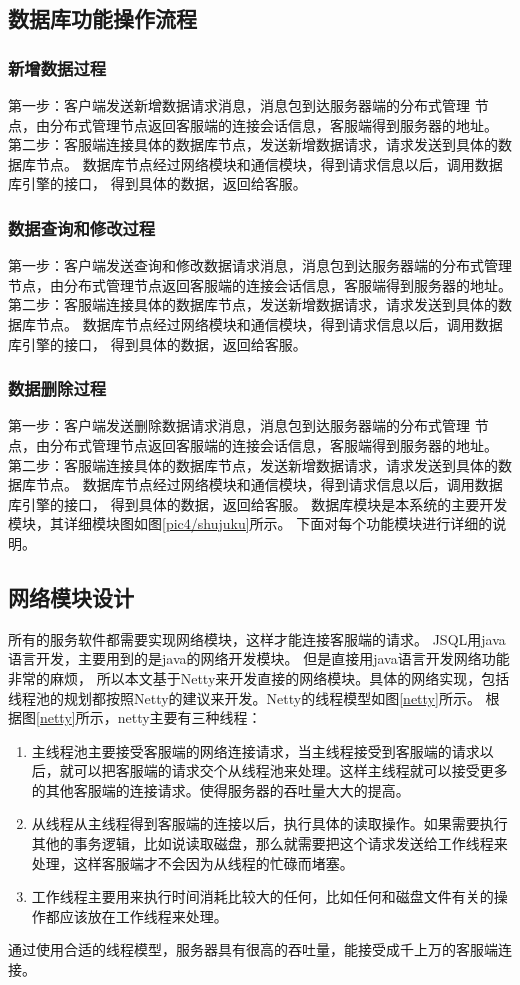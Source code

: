 \subsection{数据库功能操作流程}
\subsubsection{新增数据过程}
第一步：客户端发送新增数据请求消息，消息包到达服务器端的分布式管理
节点，由分布式管理节点返回客服端的连接会话信息，客服端得到服务器的地址。
第二步：客服端连接具体的数据库节点，发送新增数据请求，请求发送到具体的数据库节点。
数据库节点经过网络模块和通信模块，得到请求信息以后，调用数据库引擎的接口，
得到具体的数据，返回给客服。
\subsubsection{数据查询和修改过程}
第一步：客户端发送查询和修改数据请求消息，消息包到达服务器端的分布式管理
节点，由分布式管理节点返回客服端的连接会话信息，客服端得到服务器的地址。
第二步：客服端连接具体的数据库节点，发送新增数据请求，请求发送到具体的数据库节点。
数据库节点经过网络模块和通信模块，得到请求信息以后，调用数据库引擎的接口，
得到具体的数据，返回给客服。
\subsubsection{数据删除过程}
第一步：客户端发送删除数据请求消息，消息包到达服务器端的分布式管理
节点，由分布式管理节点返回客服端的连接会话信息，客服端得到服务器的地址。
第二步：客服端连接具体的数据库节点，发送新增数据请求，请求发送到具体的数据库节点。
数据库节点经过网络模块和通信模块，得到请求信息以后，调用数据库引擎的接口，
得到具体的数据，返回给客服。
数据库模块是本系统的主要开发模块，其详细模块图如图\ref{pic4/shujuku}所示。
下面对每个功能模块进行详细的说明。
\subsection{网络模块设计}
所有的服务软件都需要实现网络模块，这样才能连接客服端的请求。
JSQL用java语言开发，主要用到的是java的网络开发模块。
但是直接用java语言开发网络功能非常的麻烦，
所以本文基于Netty来开发直接的网络模块。具体的网络实现，包括
线程池的规划都按照Netty的建议来开发。Netty的线程模型如图\ref{netty}所示。
根据图\ref{netty}所示，netty主要有三种线程：
\begin{enumerate}[fullwidth,itemindent=2em,listparindent=2em]
	\item 主线程池主要接受客服端的网络连接请求，当主线程接受到客服端的请求以后，就可以把客服端的请求交个从线程池来处理。这样主线程就可以接受更多的其他客服端的连接请求。使得服务器的吞吐量大大的提高。
	\item 从线程从主线程得到客服端的连接以后，执行具体的读取操作。如果需要执行其他的事务逻辑，比如说读取磁盘，那么就需要把这个请求发送给工作线程来处理，这样客服端才不会因为从线程的忙碌而堵塞。
	\item 工作线程主要用来执行时间消耗比较大的任何，比如任何和磁盘文件有关的操作都应该放在工作线程来处理。
\end{enumerate}
通过使用合适的线程模型，服务器具有很高的吞吐量，能接受成千上万的客服端连接。
